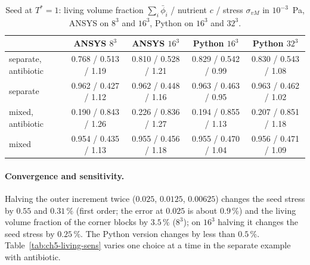 \begin{table}[htbp]
  \centering
  \caption[Python against ANSYS]{%
    Seed at $T^*=1$: living volume fraction $\sum_i\bar\phi_i$ / nutrient $c$ / stress $\sigma_{vM}$ in
    $10^{-3}$~Pa, ANSYS on $8^3$ and $16^3$, Python on $16^3$ and $32^3$.}
  \label{tab:ch5-living-py}
  \begin{tabular}{lcccc}
    \toprule
    & ANSYS $8^3$ & ANSYS $16^3$ & Python $16^3$ & Python $32^3$\\
    \midrule
    separate, antibiotic & 0.768 / 0.513 / 1.19 & 0.810 / 0.528 / 1.21 & 0.829 / 0.542 / 0.99 & 0.830 / 0.543 / 1.08\\
    separate & 0.962 / 0.427 / 1.12 & 0.962 / 0.448 / 1.16 & 0.963 / 0.463 / 0.95 & 0.963 / 0.462 / 1.02\\
    mixed, antibiotic & 0.190 / 0.843 / 1.26 & 0.226 / 0.836 / 1.27 & 0.194 / 0.855 / 1.13 & 0.207 / 0.851 / 1.18\\
    mixed & 0.954 / 0.435 / 1.13 & 0.955 / 0.456 / 1.18 & 0.955 / 0.470 / 1.04 & 0.956 / 0.471 / 1.09\\
    \bottomrule
  \end{tabular}
\end{table}

\paragraph{Convergence and sensitivity.}
Halving the outer increment twice ($0.025$, $0.0125$, $0.00625$) changes the seed stress by $0.55$ and
$0.31\,\%$ (first order; the error at $0.025$ is about $0.9\,\%$) and the living volume fraction of the
corner blocks by $3.5\,\%$ ($8^3$); on $16^3$ halving it changes the seed stress by $0.25\,\%$. The Python
version changes by less than $0.5\,\%$.
Table~\ref{tab:ch5-living-sens} varies one choice at a time in the separate example with antibiotic.

